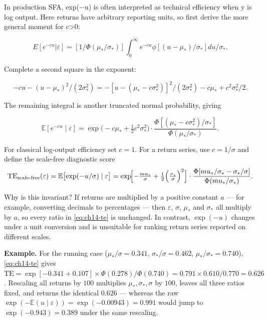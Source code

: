 In production SFA, exp(\ensuremath{-}u) is often interpreted as technical efficiency
when y is log output. Here returns have arbitrary reporting units, so
first derive the more general moment for c\textgreater0:

\begin{equation}
E[e^{-cu}|\varepsilon ] = [1/\Phi (\mu _{*}/\sigma _{*})] \int _{0}^{\infty} e^{-cu} \phi [(u-\mu _{*})/\sigma _{*}]du/\sigma _{*}.
\end{equation}

Complete a second square in the exponent:

\begin{equation}
-cu-(u-\mu _{*})^{2}/(2\sigma _{*}^{2}) = -[u-(\mu _{*}-c\sigma _{*}^{2})]^{2}/(2\sigma _{*}^{2}) - c\mu _{*} + c^{2}\sigma _{*}^{2}/2.
\end{equation}

The remaining integral is another truncated normal probability, giving

\begin{equation}\label{eq:ch14-mgf}
\mathbb{E}[e^{-cu}\mid\varepsilon ] = \exp\!\bigl(-c\mu _{*}+\tfrac12 c^{2}\sigma _{*}^{2}\bigr) \cdot  \frac{\Phi [(\mu _{*}-c\sigma _{*}^{2})/\sigma _{*}]}{\Phi (\mu _{*}/\sigma _{*})}.
\end{equation}

For classical log-output efficiency set $c=1$. For a return series, use
$c=1/\sigma$ and define the scale-free diagnostic score
\begin{equation}\label{eq:ch14-te}
\mathrm{TE}_{\text{scale-free}}(\varepsilon )=\mathbb{E}\bigl[\exp(-u/\sigma )\mid\varepsilon \bigr]
= \exp\!\Bigl[-\tfrac{\mu _{*}}{\sigma } + \tfrac12\Bigl(\tfrac{\sigma _{*}}{\sigma }\Bigr)^{2}\Bigr] \cdot  \frac{\Phi [\mu _{*}/\sigma _{*}-\sigma _{*}/\sigma ]}{\Phi (\mu _{*}/\sigma _{*})}.
\end{equation}

Why is this invariant? If returns are multiplied by a positive constant $a$
--- for example, converting decimals to percentages --- then $\varepsilon$,
$\sigma$, $\mu_*$ and $\sigma_*$ all multiply by $a$, so every ratio in
\eqref{eq:ch14-te} is unchanged. In contrast, $\exp(-u)$ changes under a
unit conversion and is unsuitable for ranking return series reported on
different scales.

\textbf{Example.} For the running case ($\mu_*/\sigma=0.341$,
$\sigma_*/\sigma=0.462$, $\mu_*/\sigma_*=0.740$),
\eqref{eq:ch14-te} gives $\mathrm{TE}=\exp[-0.341+0.107]\times\Phi(0.278)/\Phi(0.740)
=0.791\times0.610/0.770=0.626$. Rescaling all returns by $100$ multiplies
$\mu_*,\sigma_*,\sigma$ by $100$, leaves all three ratios fixed, and returns
the identical $0.626$ --- whereas the raw $\exp(-\mathbb{E}(u\mid\varepsilon))
=\exp(-0.00943)=0.991$ would jump to $\exp(-0.943)=0.389$ under the same
rescaling.

